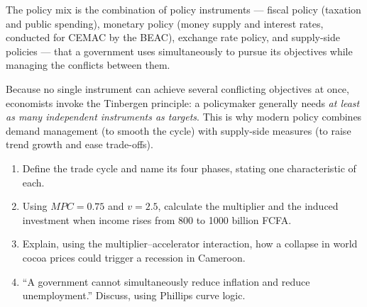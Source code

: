 \documentclass[11pt]{article}
\newcommand{\cle}[1]{{\popxbold\color{popdark}#1}}
\begin{document}
\begin{definition}
The \cle{policy mix} is the combination of policy instruments --- fiscal policy (taxation and public spending), monetary policy (money supply and interest rates, conducted for CEMAC by the BEAC), exchange rate policy, and supply-side policies --- that a government uses simultaneously to pursue its objectives while managing the conflicts between them.
\end{definition}

Because no single instrument can achieve several conflicting objectives at once, economists invoke the Tinbergen principle: a policymaker generally needs \emph{at least as many independent instruments as targets}. This is why modern policy combines demand management (to smooth the cycle) with supply-side measures (to raise trend growth and ease trade-offs).

\begin{exercice}
\begin{enumerate}
\item Define the trade cycle and name its four phases, stating one characteristic of each.
\item Using $MPC = 0.75$ and $v = 2.5$, calculate the multiplier and the induced investment when income rises from 800 to 1000 billion FCFA.
\item Explain, using the multiplier--accelerator interaction, how a collapse in world cocoa prices could trigger a recession in Cameroon.
\item ``A government cannot simultaneously reduce inflation and reduce unemployment.'' Discuss, using Phillips curve logic.
\end{enumerate}
\end{exercice}
\end{document}
